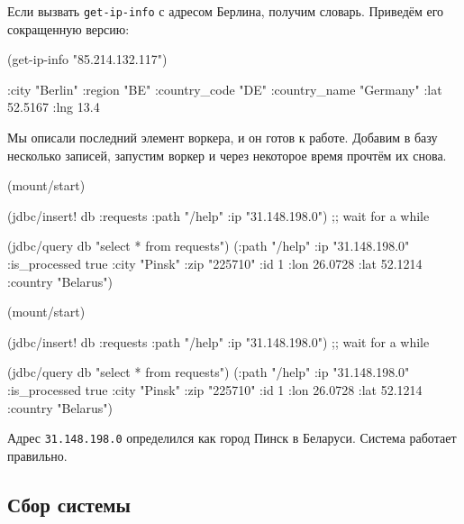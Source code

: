 \fi

\noindent
Если вызвать \verb|get-ip-info| с адресом Берлина, получим словарь. Приведём его
сокращенную версию:

\begin{english}
  \begin{clojure}
(get-ip-info "85.214.132.117")

{:city "Berlin"
 :region "BE"
 :country_code "DE"
 :country_name "Germany"
 :lat 52.5167
 :lng 13.4}
  \end{clojure}
\end{english}

Мы описали последний элемент воркера, и он готов к работе. Добавим в базу
несколько записей, запустим воркер и через некоторое время прочтём их снова.

\pagebreaklarge[3]

\ifnarrow

\begin{english}
  \begin{clojure}
(mount/start)

(jdbc/insert! db :requests
  {:path "/help" :ip "31.148.198.0"})
;; wait for a while

(jdbc/query db "select * from requests")
({:path "/help"
  :ip "31.148.198.0"
  :is_processed true
  :city "Pinsk"
  :zip "225710" :id 1
  :lon 26.0728 :lat 52.1214
  :country "Belarus"})
  \end{clojure}
\end{english}

\else

\begin{english}
  \begin{clojure}
(mount/start)

(jdbc/insert! db :requests
              {:path "/help" :ip "31.148.198.0"})
;; wait for a while

(jdbc/query db "select * from requests")
({:path "/help" :ip "31.148.198.0" :is_processed true
  :city "Pinsk" :zip "225710" :id 1
  :lon 26.0728 :lat 52.1214 :country "Belarus"})
  \end{clojure}
\end{english}

\fi

Адрес \verb|31.148.198.0| определился как город Пинск в Беларуси. Система
работает правильно.

\subsection{Сбор системы}

